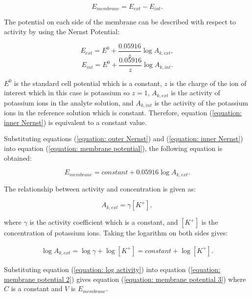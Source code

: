 \begin{equation}
    E_{membrane} = E_{ext} - E_{int}.
    \label{equation: membrane potential}
\end{equation}

The potential on each side of the membrane can be described with respect to activity by using the Nernst Potential:

\begin{equation}
    E_{ext} = E^{0} + \frac{0.05916}{z}\log A_{k,ext}, 
    \label{equation: outer Nernst} 
\end{equation}
\begin{equation}
    E_{int} = E^{0} + \frac{0.05916}{z}\log A_{k,int}.
    \label{equation: inner Nernst}
\end{equation}

\noindent $E^{0}$ is the standard cell potential which is a constant, $z$ is the charge of the ion of interest which in this case is potassium so $z=1$, $A_{k,ext}$ is the activity of potassium ions in the analyte solution, and $A_{k,int}$ is the activity of the potassium ions in the reference solution which is constant. Therefore, equation (\ref{equation: inner Nernst}) is equivalent to a constant value.

Substituting equations (\ref{equation: outer Nernst}) and (\ref{equation: inner Nernst}) into equation (\ref{equation: membrane potential}), the following equation is obtained:

\begin{equation}
    E_{membrane} = constant + 0.05916\log A_{k,ext}.
    \label{equation: membrane potential 2}
\end{equation}

The relationship between activity and concentration is given as:

\begin{equation}
    A_{k,ext} = \gamma [K^{+}],
    \label{equation: activity}
\end{equation}

\noindent where $\gamma$ is the activity coefficient which is a constant, and $[K^{+}]$ is the concentration of potassium ions. Taking the logarithm on both sides gives:

\begin{align}
    \log A_{k,ext} = \log\gamma + \log [K^{+}] = constant + \log [K^{+}].
    \label{equation: log activity}
\end{align}

Substituting equation (\ref{equation: log activity}) into equation (\ref{equation: membrane potential 2}) gives equation (\ref{equation: membrane potential 3}) where $C$ is a constant and $V$ is $E_{membrane}$.

